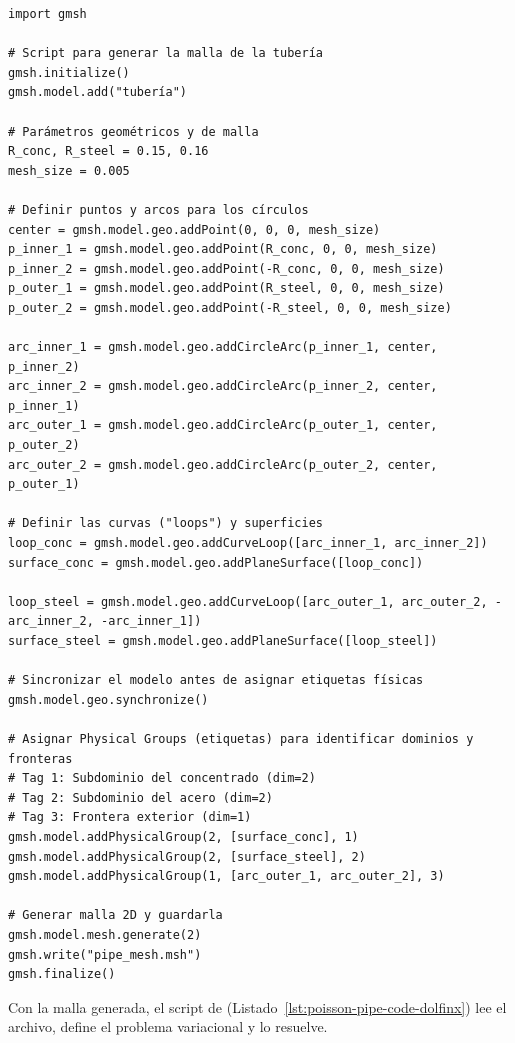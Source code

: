 \begin{codelisting}[h!]
\begin{verbatim}
import gmsh

# Script para generar la malla de la tubería
gmsh.initialize()
gmsh.model.add("tubería")

# Parámetros geométricos y de malla
R_conc, R_steel = 0.15, 0.16
mesh_size = 0.005 

# Definir puntos y arcos para los círculos
center = gmsh.model.geo.addPoint(0, 0, 0, mesh_size)
p_inner_1 = gmsh.model.geo.addPoint(R_conc, 0, 0, mesh_size)
p_inner_2 = gmsh.model.geo.addPoint(-R_conc, 0, 0, mesh_size)
p_outer_1 = gmsh.model.geo.addPoint(R_steel, 0, 0, mesh_size)
p_outer_2 = gmsh.model.geo.addPoint(-R_steel, 0, 0, mesh_size)

arc_inner_1 = gmsh.model.geo.addCircleArc(p_inner_1, center, p_inner_2)
arc_inner_2 = gmsh.model.geo.addCircleArc(p_inner_2, center, p_inner_1)
arc_outer_1 = gmsh.model.geo.addCircleArc(p_outer_1, center, p_outer_2)
arc_outer_2 = gmsh.model.geo.addCircleArc(p_outer_2, center, p_outer_1)

# Definir las curvas ("loops") y superficies
loop_conc = gmsh.model.geo.addCurveLoop([arc_inner_1, arc_inner_2])
surface_conc = gmsh.model.geo.addPlaneSurface([loop_conc])

loop_steel = gmsh.model.geo.addCurveLoop([arc_outer_1, arc_outer_2, -arc_inner_2, -arc_inner_1])
surface_steel = gmsh.model.geo.addPlaneSurface([loop_steel])

# Sincronizar el modelo antes de asignar etiquetas físicas
gmsh.model.geo.synchronize()

# Asignar Physical Groups (etiquetas) para identificar dominios y fronteras
# Tag 1: Subdominio del concentrado (dim=2)
# Tag 2: Subdominio del acero (dim=2)
# Tag 3: Frontera exterior (dim=1)
gmsh.model.addPhysicalGroup(2, [surface_conc], 1) 
gmsh.model.addPhysicalGroup(2, [surface_steel], 2)
gmsh.model.addPhysicalGroup(1, [arc_outer_1, arc_outer_2], 3) 

# Generar malla 2D y guardarla
gmsh.model.mesh.generate(2)
gmsh.write("pipe_mesh.msh")
gmsh.finalize()
\end{verbatim}
\caption{Script Python/GMSH para generar la geometría, malla y etiquetas físicas de la tubería.}
\label{lst:gmsh-code}
\end{codelisting}

Con la malla generada, el script de \fenics (Listado~\ref{lst:poisson-pipe-code-dolfinx}) lee el archivo, define el problema variacional y lo resuelve.

